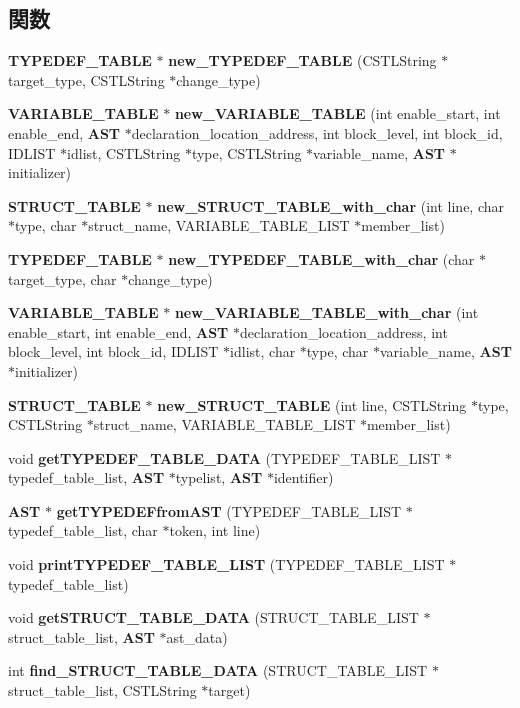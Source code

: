 \subsection*{関数}
\begin{DoxyCompactItemize}
\item 
{\bf TYPEDEF\_\-TABLE} $\ast$ {\bf new\_\-TYPEDEF\_\-TABLE} (CSTLString $\ast$target\_\-type, CSTLString $\ast$change\_\-type)
\item 
{\bf VARIABLE\_\-TABLE} $\ast$ {\bf new\_\-VARIABLE\_\-TABLE} (int enable\_\-start, int enable\_\-end, {\bf AST} $\ast$declaration\_\-location\_\-address, int block\_\-level, int block\_\-id, IDLIST $\ast$idlist, CSTLString $\ast$type, CSTLString $\ast$variable\_\-name, {\bf AST} $\ast$initializer)
\item 
{\bf STRUCT\_\-TABLE} $\ast$ {\bf new\_\-STRUCT\_\-TABLE\_\-with\_\-char} (int line, char $\ast$type, char $\ast$struct\_\-name, VARIABLE\_\-TABLE\_\-LIST $\ast$member\_\-list)
\item 
{\bf TYPEDEF\_\-TABLE} $\ast$ {\bf new\_\-TYPEDEF\_\-TABLE\_\-with\_\-char} (char $\ast$target\_\-type, char $\ast$change\_\-type)
\item 
{\bf VARIABLE\_\-TABLE} $\ast$ {\bf new\_\-VARIABLE\_\-TABLE\_\-with\_\-char} (int enable\_\-start, int enable\_\-end, {\bf AST} $\ast$declaration\_\-location\_\-address, int block\_\-level, int block\_\-id, IDLIST $\ast$idlist, char $\ast$type, char $\ast$variable\_\-name, {\bf AST} $\ast$initializer)
\item 
{\bf STRUCT\_\-TABLE} $\ast$ {\bf new\_\-STRUCT\_\-TABLE} (int line, CSTLString $\ast$type, CSTLString $\ast$struct\_\-name, VARIABLE\_\-TABLE\_\-LIST $\ast$member\_\-list)
\item 
void {\bf getTYPEDEF\_\-TABLE\_\-DATA} (TYPEDEF\_\-TABLE\_\-LIST $\ast$typedef\_\-table\_\-list, {\bf AST} $\ast$typelist, {\bf AST} $\ast$identifier)
\item 
{\bf AST} $\ast$ {\bf getTYPEDEFfromAST} (TYPEDEF\_\-TABLE\_\-LIST $\ast$typedef\_\-table\_\-list, char $\ast$token, int line)
\item 
void {\bf printTYPEDEF\_\-TABLE\_\-LIST} (TYPEDEF\_\-TABLE\_\-LIST $\ast$typedef\_\-table\_\-list)
\item 
void {\bf getSTRUCT\_\-TABLE\_\-DATA} (STRUCT\_\-TABLE\_\-LIST $\ast$struct\_\-table\_\-list, {\bf AST} $\ast$ast\_\-data)
\item 
int {\bf find\_\-STRUCT\_\-TABLE\_\-DATA} (STRUCT\_\-TABLE\_\-LIST $\ast$struct\_\-table\_\-list, CSTLString $\ast$target)
\item 

\end{DoxyCompactItemize}
